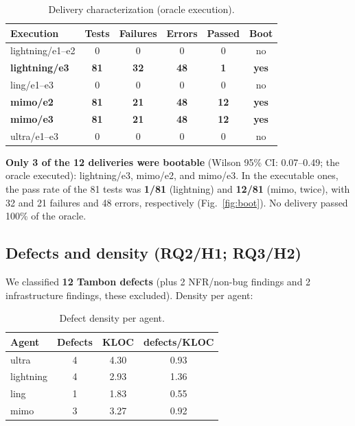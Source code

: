 \documentclass[11pt]{article}
\begin{document}
\begin{table}[htbp]
  \centering
  \caption{Delivery characterization (oracle execution).}
  \label{tab:delivery}
  \begin{tabular}{lccccc}
    \toprule
    Execution & Tests & Failures & Errors & Passed & Boot \\
    \midrule
    lightning/e1--e2 & 0 & 0 & 0 & 0 & no \\
    \textbf{lightning/e3} & \textbf{81} & \textbf{32} & \textbf{48} & \textbf{1} & \textbf{yes} \\
    ling/e1--e3 & 0 & 0 & 0 & 0 & no \\
    \textbf{mimo/e2} & \textbf{81} & \textbf{21} & \textbf{48} & \textbf{12} & \textbf{yes} \\
    \textbf{mimo/e3} & \textbf{81} & \textbf{21} & \textbf{48} & \textbf{12} & \textbf{yes} \\
    ultra/e1--e3 & 0 & 0 & 0 & 0 & no \\
    \bottomrule
  \end{tabular}
\end{table}

\textbf{Only 3 of the 12 deliveries were bootable} (Wilson 95\% CI: 0.07--0.49; the oracle executed): lightning/e3, mimo/e2, and mimo/e3. In the executable ones, the pass rate of the 81 tests was \textbf{1/81} (lightning) and \textbf{12/81} (mimo, twice), with 32 and 21 failures and 48 errors, respectively (Fig.~\ref{fig:boot}). No delivery passed 100\% of the oracle.

\subsection{Defects and density (RQ2/H1; RQ3/H2)}

We classified \textbf{12 Tambon defects} (plus 2 NFR/non-bug findings and 2 infrastructure findings, these excluded). Density per agent:

\begin{table}[htbp]
  \centering
  \caption{Defect density per agent.}
  \label{tab:density}
  \begin{tabular}{lccc}
    \toprule
    Agent & Defects & KLOC & defects/KLOC \\
    \midrule
    ultra & 4 & 4.30 & 0.93 \\
    lightning & 4 & 2.93 & 1.36 \\
    ling & 1 & 1.83 & 0.55 \\
    mimo & 3 & 3.27 & 0.92 \\
    \bottomrule
  \end{tabular}
\end{table}
\end{document}
